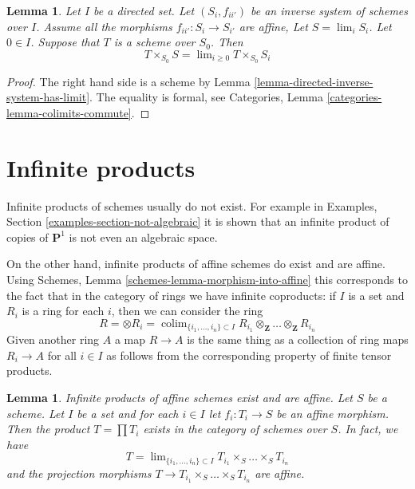 \documentclass{stacks-project}
\newenvironment{slogan}{\comment}{\endcomment}
\theoremstyle{plain}
\newtheorem{lemma}[subsection]{Lemma}
\theoremstyle{definition}
\theoremstyle{remark}
\numberwithin{equation}{subsection}
\def\lim{\mathop{\mathrm{lim}}\nolimits}
\def\colim{\mathop{\mathrm{colim}}\nolimits}
\begin{document}
\begin{lemma}
\label{lemma-scheme-over-limit}
Let $I$ be a directed set.
Let $(S_i, f_{ii'})$ be an inverse system of schemes over $I$.
Assume all the morphisms $f_{ii'} : S_i \to S_{i'}$ are affine,
Let $S = \lim_i S_i$. Let $0 \in I$.
Suppose that $T$ is a scheme over $S_0$.
Then
$$
T \times_{S_0} S = \lim_{i \geq 0} T \times_{S_0} S_i
$$
\end{lemma}

\begin{proof}
The right hand side is a scheme by
Lemma \ref{lemma-directed-inverse-system-has-limit}.
The equality is formal, see
Categories, Lemma \ref{categories-lemma-colimits-commute}.
\end{proof}



\section{Infinite products}
\label{section-inifinite-products}

\noindent
Infinite products of schemes usually do not exist. For example in
Examples, Section \ref{examples-section-not-algebraic}
it is shown that an infinite product of
copies of $\mathbf{P}^1$ is not even an algebraic space.

\medskip\noindent
On the other hand, infinite products of affine schemes do exist
and are affine. Using Schemes, Lemma \ref{schemes-lemma-morphism-into-affine}
this corresponds to the fact that in the category of rings
we have infinite coproducts: if $I$ is a set and $R_i$ is a ring
for each $i$, then we can consider the ring
$$
R = \otimes R_i =
\colim_{\{i_1, \ldots, i_n\} \subset I}
R_{i_1} \otimes_\mathbf{Z} \ldots \otimes_\mathbf{Z} R_{i_n}
$$
Given another ring $A$ a map $R \to A$ is the same thing as a
collection of ring maps $R_i \to A$ for all $i \in I$ as
follows from the corresponding property of finite tensor products.

\begin{lemma}
\label{lemma-infinite-product}
\begin{slogan}
Infinite products of affine schemes exist and are affine.
\end{slogan}
Let $S$ be a scheme. Let $I$ be a set and for each $i \in I$
let $f_i : T_i \to S$ be an affine morphism. Then the
product $T = \prod T_i$ exists in the category of schemes
over $S$. In fact, we have
$$
T = \lim_{\{i_1, \ldots, i_n\} \subset I}
T_{i_1} \times_S \ldots \times_S T_{i_n}
$$
and the projection morphisms $T \to T_{i_1} \times_S \ldots \times_S T_{i_n}$
are affine.
\end{lemma}
\end{document}
